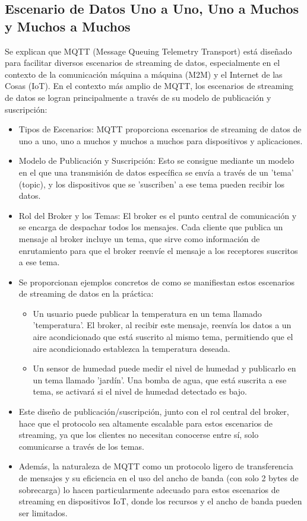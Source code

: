 \documentclass{report}
\begin{document}
\subsection{Escenario de Datos Uno a Uno, Uno a Muchos y Muchos a Muchos}
Se  explican que MQTT (Message Queuing Telemetry Transport) está diseñado para facilitar diversos escenarios de streaming de datos, 
especialmente en el contexto de la comunicación máquina a máquina (M2M) y el Internet de las Cosas (IoT).
En el contexto más amplio de MQTT, los escenarios de streaming de datos se logran principalmente a través de su modelo de publicación y suscripción:
\begin{itemize}
    \item Tipos de Escenarios: MQTT proporciona escenarios de streaming de datos de uno a uno, uno a muchos y muchos a muchos para dispositivos y 
    aplicaciones.
    \item Modelo de Publicación y Suscripción: Esto se consigue mediante un modelo en el que una transmisión de datos específica se envía a través 
    de un 'tema' (topic), y los dispositivos que se 'suscriben' a ese tema pueden recibir los datos.
    \item Rol del Broker y los Temas: El broker es el punto central de comunicación y se encarga de despachar todos los mensajes. Cada cliente 
    que publica un mensaje al broker incluye un tema, que sirve como información de enrutamiento para que el broker reenvíe el mensaje a los 
    receptores suscritos a ese tema. 
    
    \item Se  proporcionan ejemplos concretos de como se manifiestan estos escenarios de streaming de datos en la práctica:
    \begin{itemize}
        \item Un usuario puede publicar la temperatura en un tema llamado 'temperatura'. El broker, al recibir este mensaje, reenvía los 
        datos a un aire acondicionado que está suscrito al mismo tema, permitiendo que el aire acondicionado establezca la temperatura deseada.
        \item Un sensor de humedad puede medir el nivel de humedad y publicarlo en un tema llamado 'jardín'. Una bomba de agua, que está 
        suscrita a ese tema, se activará si el nivel de humedad detectado es bajo.
    \end{itemize}

    \item Este diseño de publicación/suscripción, junto con el rol central del broker, hace que el protocolo sea altamente escalable para estos 
    escenarios de streaming, ya que los clientes no necesitan conocerse entre sí, solo comunicarse a través de los temas.

    \item Además, la naturaleza de MQTT como un protocolo ligero de transferencia de mensajes y su eficiencia en el uso del ancho de banda 
    (con solo 2 bytes de sobrecarga) lo hacen particularmente adecuado para estos escenarios de streaming en dispositivos IoT, donde los recursos 
    y el ancho de banda pueden ser limitados.
\end{itemize}
\end{document}
